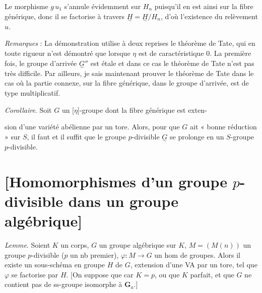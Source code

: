 \documentclass[11pt,a4paper]{article}
\begin{document}

Le morphisme $g\,u_1$ s'annule évidemment sur $H_n$ puisqu'il en est ainsi sur
la fibre générique, donc il se factorise à travers
$\underset{\sim}{H} = \underset{\sim}{H}/H_n$, d'où l'existence du relèvement
$u$.

\emph{Remarques} : La démonstration utilise à deux reprises le théorème
de Tate, qui en toute rigueur n'est démontré que lorsque $\eta$ est de
caractéristique $0$. La première fois, le groupe d'arrivée
$\underset{\sim}{G}''$ est étale et dans ce cas le théorème de Tate n'est pas
très difficile. Par ailleurs, je sais maintenant prouver le théorème de Tate
dans le cas où la partie connexe, sur la fibre générique, dans le groupe
d'arrivée, est de type multiplicatif.

\emph{Corollaire}. Soit $G$ un  [$\eta$]-groupe
 dont la fibre générique est exten-

sion d'une variété abélienne par un tore. Alors, pour que $G$  ait
« bonne réduction » sur $S$, il faut et il suffit que le groupe
$p$-divisible $\underset{\sim}{G}$ se prolonge en un $S$-groupe
$p$-divisible.

\section{[Homomorphismes d'un groupe $p$-divisible dans un groupe algébrique]}

\emph{Lemme}. Soient $K$ un corps, $G$ un groupe algébrique sur $K$,
$M = (M(n))$ un groupe $p$-divisible ($p$ un nb premier), $\varphi : M \to G$ un hom de groupes.
Alors il existe un sous-schéma en groupe $H$ de $G$, extension d'une VA par un
tore, tel que $\varphi$ se factorise par $H$.
[On suppose que car $K = p$, ou que $K$ parfait, et que $G$ ne contient pas de
ss-groupe isomorphe à $\mathbf{G}_a$.]
\end{document}
